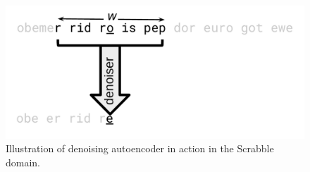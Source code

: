 \begin{figure}
  \includegraphics[width=0.6\linewidth]{img/scrabble_denoiser}
  \caption{Illustration of denoising autoencoder in action in the Scrabble domain.}
  \label{fig:scrabble_denoiser}
\end{figure}
